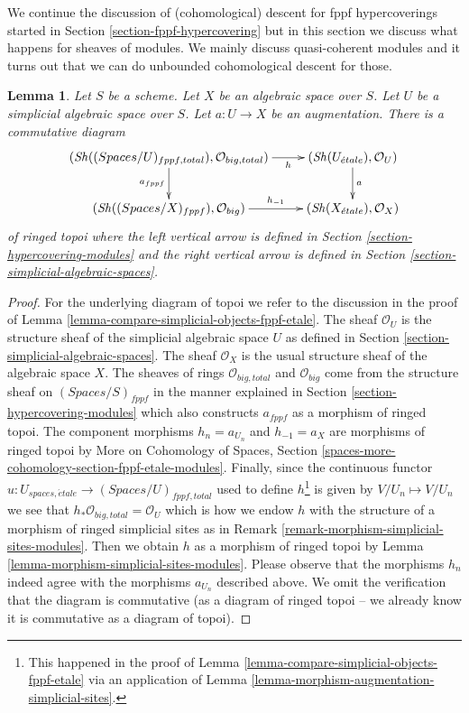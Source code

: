 \documentclass{stacks-project}
\theoremstyle{plain}
\newtheorem{lemma}[subsection]{Lemma}
\theoremstyle{definition}
\theoremstyle{remark}
\numberwithin{equation}{subsection}
\def\Sh{\mathop{\mathit{Sh}}\nolimits}
\def\etale{{\acute{e}tale}}
\begin{document}
\noindent
We continue the discussion of (cohomological) descent for fppf hypercoverings
started in Section \ref{section-fppf-hypercovering}
but in this section we discuss what happens for sheaves of modules.
We mainly discuss quasi-coherent modules and it turns out that
we can do unbounded cohomological descent for those.

\begin{lemma}
\label{lemma-compare-simplicial-objects-fppf-etale-modules}
Let $S$ be a scheme. Let $X$ be an algebraic space over $S$.
Let $U$ be a simplicial algebraic space over $S$.
Let $a : U \to X$ be an augmentation. There is a commutative diagram
$$
\xymatrix{
(\Sh((\textit{Spaces}/U)_{fppf, total}), \mathcal{O}_{big, total})
\ar[r]_-h \ar[d]_{a_{fppf}} &
(\Sh(U_\etale), \mathcal{O}_U) \ar[d]^a \\
(\Sh((\textit{Spaces}/X)_{fppf}), \mathcal{O}_{big}) \ar[r]^-{h_{-1}} &
(\Sh(X_\etale), \mathcal{O}_X)
}
$$
of ringed topoi where the left vertical arrow is defined in
Section \ref{section-hypercovering-modules}
and the right vertical arrow is defined in
Section \ref{section-simplicial-algebraic-spaces}.
\end{lemma}

\begin{proof}
For the underlying diagram of topoi we refer to the discussion in
the proof of Lemma \ref{lemma-compare-simplicial-objects-fppf-etale}.
The sheaf $\mathcal{O}_U$ is the structure sheaf of the
simplicial algebraic space $U$ as defined in
Section \ref{section-simplicial-algebraic-spaces}.
The sheaf $\mathcal{O}_X$ is the usual structure sheaf of the algebraic
space $X$. The sheaves of rings $\mathcal{O}_{big, total}$ and
$\mathcal{O}_{big}$ come from the structure sheaf on
$(\textit{Spaces}/S)_{fppf}$ in the manner explained in
Section \ref{section-hypercovering-modules}
which also constructs $a_{fppf}$ as a morphism of ringed topoi.
The component morphisms $h_n = a_{U_n}$ and $h_{-1} = a_X$
are morphisms of ringed topoi by
More on Cohomology of Spaces, Section
\ref{spaces-more-cohomology-section-fppf-etale-modules}.
Finally, since the continuous functor
$u : U_{spaces, \etale} \to (\textit{Spaces}/U)_{fppf, total}$
used to define $h$\footnote{This happened in the proof of
Lemma \ref{lemma-compare-simplicial-objects-fppf-etale}
via an application of
Lemma \ref{lemma-morphism-augmentation-simplicial-sites}.}
is given by $V/U_n \mapsto V/U_n$
we see that $h_*\mathcal{O}_{big, total} = \mathcal{O}_U$
which is how we endow $h$ with the structure of a morphism
of ringed simplicial sites as in
Remark \ref{remark-morphism-simplicial-sites-modules}.
Then we obtain $h$ as a morphism of ringed topoi
by Lemma \ref{lemma-morphism-simplicial-sites-modules}.
Please observe that the morphisms $h_n$ indeed agree
with the morphisms $a_{U_n}$ described above.
We omit the verification
that the diagram is commutative (as a diagram of
ringed topoi -- we already know it is commutative
as a diagram of topoi).
\end{proof}
\end{document}
